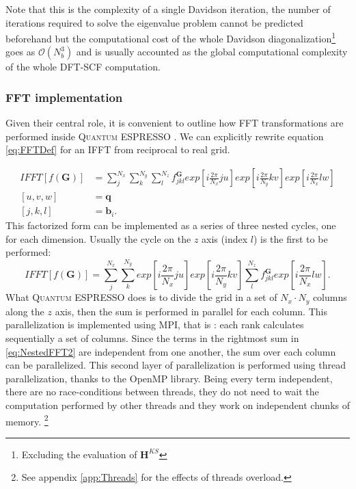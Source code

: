 \documentclass[a4paper,12pt]{article}
\newcommand\mf[1]{\mathbf{#1}}
\newcommand\GI{\mathbf{G}}
\newcommand\QE{\textsc{Quantum} ESPRESSO }
\newcommand\bigO{\mathcal{O}}
\begin{document}
Note that this is the complexity of a single Davidson iteration, the number of iterations required to solve the eigenvalue problem cannot be predicted beforehand but the computational cost of the whole Davidson diagonalization\footnote{Excluding the evaluation of $\mf{H}^{KS}$} goes as $\bigO(N_{b}^3)$ and is usually accounted as the global computational complexity of the whole DFT-SCF computation.

\subsubsection{FFT implementation}\label{sec:FFT}
Given their central role, it is convenient to outline how FFT transformations are performed inside \QE .
We can explicitly rewrite equation \eqref{eq:FFTDef} for an IFFT from reciprocal to real grid.

\begin{align}
	IFFT[f(\GI)] &= \sum_{j}^{N_x} \sum_{k}^{N_y} \sum_{l}^{N_z} f^{\GI}_{jkl}
		exp \left[i \frac{2\pi}{N_x}ju \right] 
		exp \left[i \frac{2\pi}{N_y}kv \right] 
		exp \left[i \frac{2\pi}{N_x}lw \right] \\
		[u,v,w] &= \mf{q} \\
		[j,k,l] &= \mf{b}_i.
\end{align}
This factorized form can be implemented as a series of three nested cycles, one for each dimension.
Usually the cycle on the $z$ axis (index $l$) is the first to be performed:
\begin{equation}\label{eq:NestedFFT2}
	IFFT[f(\GI)] = \sum_{j}^{N_x} \sum_{k}^{N_y} 
		exp \left[i \frac{2\pi}{N_x}ju \right] 
		exp \left[i \frac{2\pi}{N_y}kv \right] 
		\sum_{l}^{N_z} 	f^{\GI}_{jkl} exp \left[i \frac{2\pi}{N_x}lw \right].
\end{equation}
What \QE does is to divide the grid in a set of $N_x \cdot N_y$ columns along the $z$ axis, then the sum is performed in parallel for each column. 
This parallelization is implemented using MPI, that is : each rank calculates sequentially a set of columns.
Since the terms in the rightmost sum in \eqref{eq:NestedFFT2} are independent from one another, the sum over each column can be parallelized. 
This second layer of parallelization is performed using thread parallelization, thanks to the OpenMP library.
Being every term independent, there are no race-conditions between threads, they do not need to wait the computation performed by other threads and they work on independent chunks of memory. \footnote{See appendix \ref{app:Threads} for the effects of threads overload.}
\end{document}
